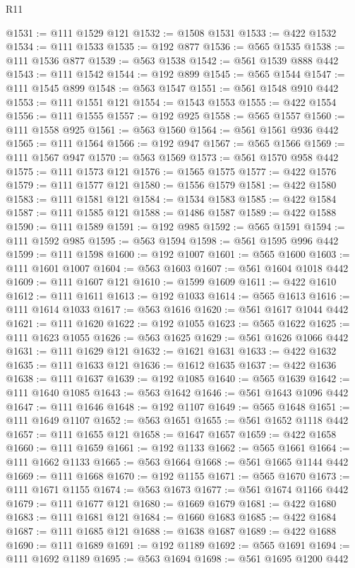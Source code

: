 \begin{lexlean}{R11}
\begin{coremodule}
@1531 := @111 @1529 @121
@1532 := @1508 @1531
@1533 := @422 @1532
@1534 := @111 @1533
@1535 := @192 @877
@1536 := @565 @1535
@1538 := @111 @1536 @877
@1539 := @563 @1538
@1542 := @561 @1539 @888 @442
@1543 := @111 @1542
@1544 := @192 @899
@1545 := @565 @1544
@1547 := @111 @1545 @899
@1548 := @563 @1547
@1551 := @561 @1548 @910 @442
@1553 := @111 @1551 @121
@1554 := @1543 @1553
@1555 := @422 @1554
@1556 := @111 @1555
@1557 := @192 @925
@1558 := @565 @1557
@1560 := @111 @1558 @925
@1561 := @563 @1560
@1564 := @561 @1561 @936 @442
@1565 := @111 @1564
@1566 := @192 @947
@1567 := @565 @1566
@1569 := @111 @1567 @947
@1570 := @563 @1569
@1573 := @561 @1570 @958 @442
@1575 := @111 @1573 @121
@1576 := @1565 @1575
@1577 := @422 @1576
@1579 := @111 @1577 @121
@1580 := @1556 @1579
@1581 := @422 @1580
@1583 := @111 @1581 @121
@1584 := @1534 @1583
@1585 := @422 @1584
@1587 := @111 @1585 @121
@1588 := @1486 @1587
@1589 := @422 @1588
@1590 := @111 @1589
@1591 := @192 @985
@1592 := @565 @1591
@1594 := @111 @1592 @985
@1595 := @563 @1594
@1598 := @561 @1595 @996 @442
@1599 := @111 @1598
@1600 := @192 @1007
@1601 := @565 @1600
@1603 := @111 @1601 @1007
@1604 := @563 @1603
@1607 := @561 @1604 @1018 @442
@1609 := @111 @1607 @121
@1610 := @1599 @1609
@1611 := @422 @1610
@1612 := @111 @1611
@1613 := @192 @1033
@1614 := @565 @1613
@1616 := @111 @1614 @1033
@1617 := @563 @1616
@1620 := @561 @1617 @1044 @442
@1621 := @111 @1620
@1622 := @192 @1055
@1623 := @565 @1622
@1625 := @111 @1623 @1055
@1626 := @563 @1625
@1629 := @561 @1626 @1066 @442
@1631 := @111 @1629 @121
@1632 := @1621 @1631
@1633 := @422 @1632
@1635 := @111 @1633 @121
@1636 := @1612 @1635
@1637 := @422 @1636
@1638 := @111 @1637
@1639 := @192 @1085
@1640 := @565 @1639
@1642 := @111 @1640 @1085
@1643 := @563 @1642
@1646 := @561 @1643 @1096 @442
@1647 := @111 @1646
@1648 := @192 @1107
@1649 := @565 @1648
@1651 := @111 @1649 @1107
@1652 := @563 @1651
@1655 := @561 @1652 @1118 @442
@1657 := @111 @1655 @121
@1658 := @1647 @1657
@1659 := @422 @1658
@1660 := @111 @1659
@1661 := @192 @1133
@1662 := @565 @1661
@1664 := @111 @1662 @1133
@1665 := @563 @1664
@1668 := @561 @1665 @1144 @442
@1669 := @111 @1668
@1670 := @192 @1155
@1671 := @565 @1670
@1673 := @111 @1671 @1155
@1674 := @563 @1673
@1677 := @561 @1674 @1166 @442
@1679 := @111 @1677 @121
@1680 := @1669 @1679
@1681 := @422 @1680
@1683 := @111 @1681 @121
@1684 := @1660 @1683
@1685 := @422 @1684
@1687 := @111 @1685 @121
@1688 := @1638 @1687
@1689 := @422 @1688
@1690 := @111 @1689
@1691 := @192 @1189
@1692 := @565 @1691
@1694 := @111 @1692 @1189
@1695 := @563 @1694
@1698 := @561 @1695 @1200 @442

\end{coremodule}
\end{lexlean}
